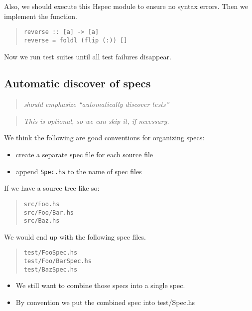 \documentclass[preprint]{sigplanconf}
\begin{document}
\noindent Also, we should execute this Hspec module
to ensure no syntax errors.
Then we implement the function.

\begin{quote}
\small
\begin{verbatim}
reverse :: [a] -> [a]
reverse = foldl (flip (:)) []
\end{verbatim}
\end{quote}

\noindent Now we run test suites until
all test failures disappear.

\subsection{Automatic discover of specs}

\begin{quote}
    \emph{should emphasize ``automatically discover tests''}
\end{quote}

\begin{quote}
\emph{This is optional, so we can skip it, if necessary.}
\end{quote}

\noindent We think the following are good conventions for organizing specs:
\begin{itemize}
    \item create a separate spec file for each source file
    \item append {\tt Spec.hs} to the name of spec files
\end{itemize}

\noindent If we have a source tree like so:

\begin{quote}
\small
\begin{verbatim}
src/Foo.hs
src/Foo/Bar.hs
src/Baz.hs
\end{verbatim}
\end{quote}

\noindent We would end up with the following spec files.

\begin{quote}
\small
\begin{verbatim}
test/FooSpec.hs
test/Foo/BarSpec.hs
test/BazSpec.hs
\end{verbatim}
\end{quote}

\begin{itemize}
\item We still want to combine those specs into a single spec.
\item By convention we put the combined spec into test/Spec.hs
\end{itemize}
\end{document}
